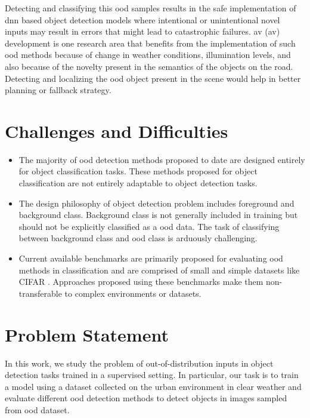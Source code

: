         Detecting and classifying this \acrshort{ood} samples results in the safe implementation of \acrshort{dnn} based object detection models where intentional or unintentional novel inputs may result in errors that might lead to catastrophic failures. \acrlong{av} (\acrshort{av}) development is one research area that benefits from the implementation of such \acrshort{ood} methods because of change in weather conditions, illumination levels, and also because of the novelty present in the semantics of the objects on the road. Detecting and localizing the \acrshort{ood} object present in the scene would help in better planning or fallback strategy.

    \section{Challenges and Difficulties}
        \begin{itemize}
            \item The majority of \acrshort{ood} detection methods proposed to date are designed entirely for object classification tasks. These methods proposed for object classification are not entirely adaptable to object detection tasks.
            \item The design philosophy of object detection problem includes foreground and background class. Background class is not generally included in training but should not be explicitly classified as a \acrshort{ood} data. The task of classifying between background class and \acrshort{ood} class is arduously challenging.
            \item Current available benchmarks are primarily proposed for evaluating \acrshort{ood} methods in classification and are comprised of small and simple datasets like CIFAR \cite{CIFAR}. Approaches proposed using these benchmarks make them non-transferable to complex environments or datasets.
        \end{itemize}


    \section{Problem Statement}
        In this work, we study the problem of out-of-distribution inputs in object detection tasks trained in a supervised setting. In particular, our task is to train a model using a dataset collected on the urban environment in clear weather and evaluate different \acrshort{ood} detection methods to detect objects in images sampled from \acrshort{ood} dataset.
        
